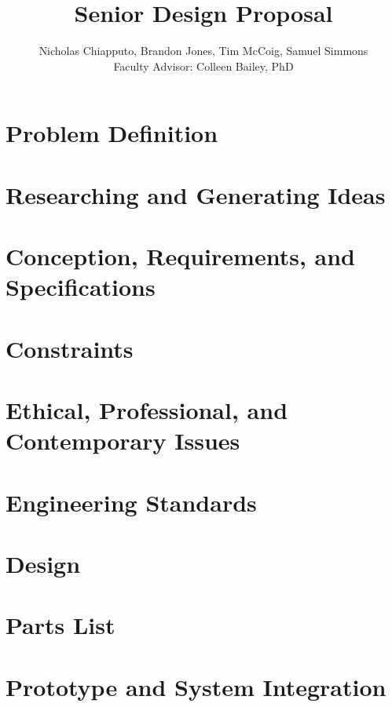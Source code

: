 \documentclass[conference]{IEEEtran}
\begin{document}
	\title{ Senior Design Proposal }

	\author{	Nicholas Chiapputo, Brandon Jones, Tim McCoig, Samuel Simmons \\
				Faculty Advisor: Colleen Bailey, PhD
	}

	\maketitle


	\section{Problem Definition}

	\section{Researching and Generating Ideas}

	\section{Conception, Requirements, and Specifications}

	\section{Constraints}

	\section{Ethical, Professional, and Contemporary Issues}

	\section{Engineering Standards}

	\section{Design}

	\section{Parts List}

	\section{Prototype and System Integration}
\end{document}
